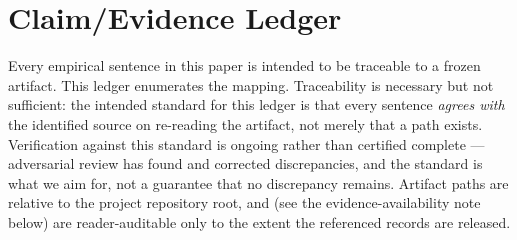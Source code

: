 \documentclass[11pt]{article}
\theoremstyle{gowthm}
\theoremstyle{gowplain}
\begin{document}
\section{Claim/Evidence Ledger}
\label{app:claims}

Every empirical sentence in this paper is intended to be traceable to a frozen
artifact. This ledger enumerates the mapping. Traceability is necessary but not
sufficient: the intended standard for this ledger is that every sentence
\emph{agrees with} the identified source on re-reading the artifact, not merely
that a path exists. Verification against this standard is ongoing rather than
certified complete --- adversarial review has found and corrected discrepancies,
and the standard is what we aim for, not a guarantee that no discrepancy
remains. Artifact paths are relative to the project repository root, and (see
the evidence-availability note below) are reader-auditable only to the extent
the referenced records are released.
\end{document}

